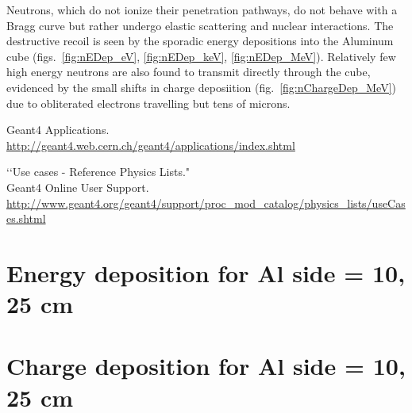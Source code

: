 \documentclass[11pt]{article}
\begin{document}
\begin{multicols}{2}
Neutrons, which do not ionize their penetration pathways, do not behave with a Bragg curve but rather undergo elastic scattering and nuclear interactions.  The destructive recoil is seen by the sporadic energy depositions into the Aluminum cube (figs.~\ref{fig:nEDep_eV}, \ref{fig:nEDep_keV}, \ref{fig:nEDep_MeV}).  Relatively few high energy neutrons are also found to transmit directly through the cube, evidenced by the small shifts in charge deposiition (fig.~\ref{fig:nChargeDep_MeV}) due to obliterated electrons travelling but tens of microns.

\begin{thebibliography}{99}

Geant4 Applications. \\
\url{http://geant4.web.cern.ch/geant4/applications/index.shtml}

\lq\lq Use cases - Reference Physics Lists." \\
Geant4 Online User Support. \\
\url{http://www.geant4.org/geant4/support/proc_mod_catalog/physics_lists/useCases.shtml}
 
\end{thebibliography}

\end{multicols}

\appendix
\newpage
\section{Energy deposition for Al side = 10, 25 cm}\label{app:EDep}

\newpage
\section{Charge deposition for Al side = 10, 25 cm}\label{app:ChargeDep}
\end{document}

